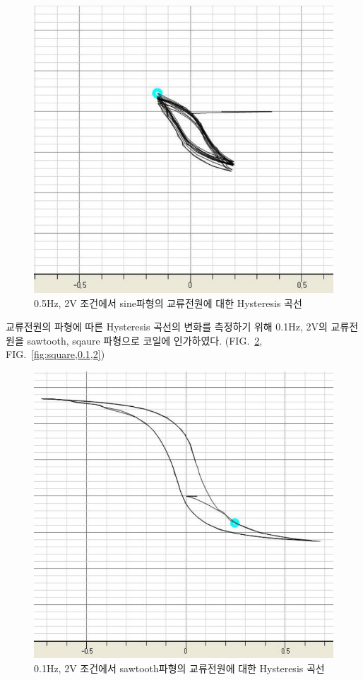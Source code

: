 \documentclass[aps,reprint,superscriptaddress,10pt]{revtex4-2}
\begin{document}
\begin{figure}[htbp]
  \centering
  \includegraphics[scale = 0.175]{sine,0.5,2.png}
  \caption{0.5Hz, 2V 조건에서 sine파형의 교류전원에 대한 Hysteresis 곡선}
  \label{fig:sine,0.5,2}
\end{figure}

교류전원의 파형에 따른 Hysteresis 곡선의 변화를 측정하기 위해 0.1Hz, 2V의
교류전원을 sawtooth, sqaure 파형으로 코일에 인가하였다. 
(FIG.~\ref{fig:sawtooth,0.1,2}, FIG.~\ref{fig:square,0.1,2})

\begin{figure}[htbp]
  \centering
  \includegraphics[scale = 0.2]{sawtooth,0.1,2.png}
  \caption{0.1Hz, 2V 조건에서 sawtooth파형의 교류전원에 대한 Hysteresis 곡선}
  \label{fig:sawtooth,0.1,2}
\end{figure}
\end{document}
